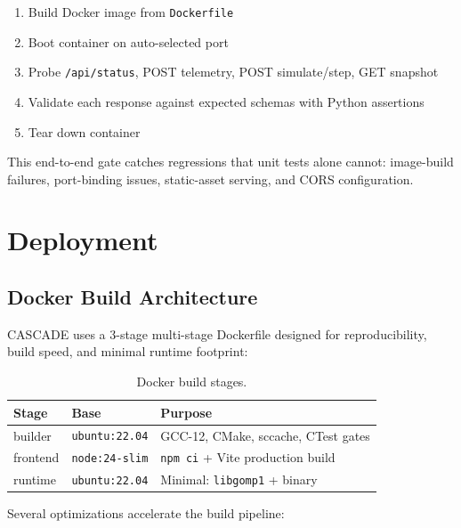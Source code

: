 \documentclass[10pt,twocolumn,letterpaper]{article}
\begin{document}
\begin{enumerate}[nosep,leftmargin=*]
  \item Build Docker image from \texttt{Dockerfile}
  \item Boot container on auto-selected port
  \item Probe \texttt{/api/status}, POST telemetry, POST simulate/step,
    GET snapshot
  \item Validate each response against expected schemas with Python
    assertions
  \item Tear down container
\end{enumerate}

\noindent
This end-to-end gate catches regressions that unit tests alone
cannot: image-build failures, port-binding issues, static-asset
serving, and CORS configuration.

\section{Deployment}\label{sec:deploy}

\subsection{Docker Build Architecture}

CASCADE uses a 3-stage multi-stage Dockerfile designed for reproducibility,
build speed, and minimal runtime footprint:

\begin{table}[h]
\centering\small
\begin{tabularx}{\linewidth}{@{}llX@{}}
\toprule
\textbf{Stage} & \textbf{Base} & \textbf{Purpose} \\
\midrule
builder  & \texttt{ubuntu:22.04} & GCC-12, CMake, sccache, CTest gates \\
frontend & \texttt{node:24-slim}  & \texttt{npm ci} + Vite production build \\
runtime  & \texttt{ubuntu:22.04} & Minimal: \texttt{libgomp1} + binary \\
\bottomrule
\end{tabularx}
\caption{Docker build stages.}
\label{tab:docker}
\end{table}

\noindent
Several optimizations accelerate the build pipeline:
\end{document}
